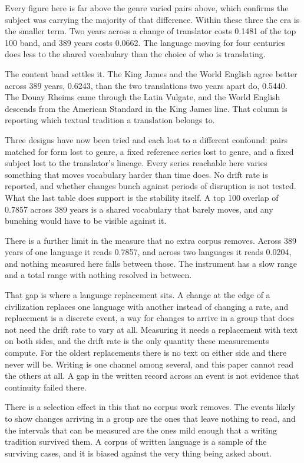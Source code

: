 Every figure here is far above the genre varied pairs above, which confirms the subject was carrying the majority of that difference. Within these three the era is the smaller term. Two years across a change of translator costs 0.1481 of the top 100 band, and 389 years costs 0.0662. The language moving for four centuries does less to the shared vocabulary than the choice of who is translating.

The content band settles it. The King James and the World English agree better across 389 years, 0.6243, than the two translations two years apart do, 0.5440. The Douay Rheims came through the Latin Vulgate, and the World English descends from the American Standard in the King James line. That column is reporting which textual tradition a translation belongs to.

Three designs have now been tried and each lost to a different confound: pairs matched for form lost to genre, a fixed reference series lost to genre, and a fixed subject lost to the translator's lineage. Every series reachable here varies something that moves vocabulary harder than time does. No drift rate is reported, and whether changes bunch against periods of disruption is not tested. What the last table does support is the stability itself. A top 100 overlap of 0.7857 across 389 years is a shared vocabulary that barely moves, and any bunching would have to be visible against it.

There is a further limit in the measure that no extra corpus removes. Across 389 years of one language it reads 0.7857, and across two languages it reads 0.0204, and nothing measured here falls between those. The instrument has a slow range and a total range with nothing resolved in between.

That gap is where a language replacement sits. A change at the edge of a civilization replaces one language with another instead of changing a rate, and replacement is a discrete event, a way for changes to arrive in a group that does not need the drift rate to vary at all. Measuring it needs a replacement with text on both sides, and the drift rate is the only quantity these measurements compute. For the oldest replacements there is no text on either side and there never will be. Writing is one channel among several, and this paper cannot read the others at all. A gap in the written record across an event is not evidence that continuity failed there.

There is a selection effect in this that no corpus work removes. The events likely to show changes arriving in a group are the ones that leave nothing to read, and the intervals that can be measured are the ones mild enough that a writing tradition survived them. A corpus of written language is a sample of the surviving cases, and it is biased against the very thing being asked about.

